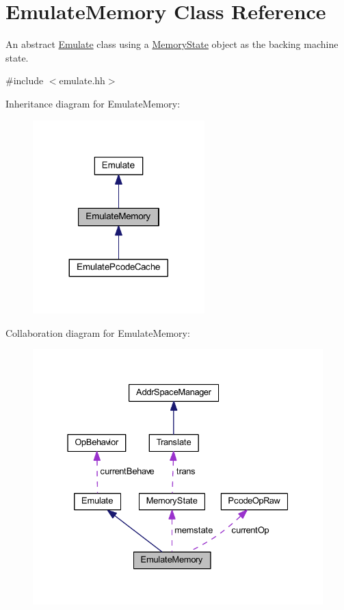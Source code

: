 \hypertarget{class_emulate_memory}{}\section{Emulate\+Memory Class Reference}
\label{class_emulate_memory}


An abstract \mbox{\hyperlink{class_emulate}{Emulate}} class using a \mbox{\hyperlink{class_memory_state}{Memory\+State}} object as the backing machine state.  




{\ttfamily \#include $<$emulate.\+hh$>$}



Inheritance diagram for Emulate\+Memory\+:
\nopagebreak
\begin{figure}[H]
\begin{center}
\leavevmode
\includegraphics[width=188pt]{class_emulate_memory__inherit__graph}
\end{center}
\end{figure}


Collaboration diagram for Emulate\+Memory\+:
\nopagebreak
\begin{figure}[H]
\begin{center}
\leavevmode
\includegraphics[width=331pt]{class_emulate_memory__coll__graph}
\end{center}
\end{figure}
